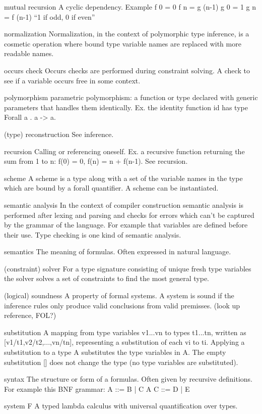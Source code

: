 mutual recursion
A cyclic dependency.
Example
f 0 = 0
f n = g (n-1)
g 0 = 1
g n = f (n-1)
``1 if odd, 0 if even''

normalization
Normalization, in the context of polymorphic type inference, is a cosmetic operation where bound type variable names are replaced with more readable names.

occurs check
Occurs checks are performed during constraint solving. A check to see if a variable occurs free in some context.

polymorphism
  parametric polymorphism: a function or type declared with generic parameters that handles them identically. Ex. the identity function id has type Forall a . a -> a.

(type) reconstruction
See inference.

recursion
Calling or referencing oneself. Ex. a recursive function returning the sum from 1 to n: f(0) = 0, f(n) = n + f(n-1).
See recursion.

scheme
A scheme is a type along with a set of the variable names in the type which are bound by a forall quantifier. A scheme can be instantiated.

semantic analysis
In the context of compiler construction semantic analysis is performed after lexing and parsing and checks for errors which can't be captured by the grammar of the language. For example that variables are defined before their use.
Type checking is one kind of semantic analysis.

semantics
The meaning of formulas. Often expressed in natural language.

(constraint) solver
For a type signature consisting of unique fresh type variables the solver solves a set of constraints to find the most general type.

(logical) soundness
A property of formal systems. A system is sound if the inference rules only produce valid conclusions from valid premisses.
(look up reference, FOL?)

substitution
A mapping from type variables v1...vn to types t1...tn, written as [v1/t1,v2/t2,...,vn/tn], representing a substitution of each vi to ti. Applying a substitution to a type A substitutes the type variables in A. The empty substitution [] does not change the type (no type variables are substituted).

syntax
The structure or form of a formulas. Often given by recursive definitions.
For example this BNF grammar:
A ::= B | C A
C ::= D | E

system F
A typed lambda calculus with universal quantification over types.

